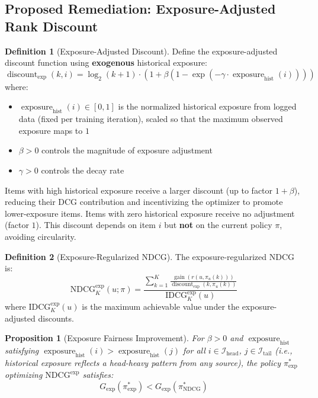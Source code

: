 \documentclass[11pt,a4paper]{article}
\theoremstyle{definition}
\newtheorem{definition}{Definition}[section]
\theoremstyle{plain}
\newtheorem{proposition}[theorem]{Proposition}
\theoremstyle{remark}
\newcommand{\NDCG}{\mathrm{NDCG}}
\newcommand{\IDCG}{\mathrm{IDCG}}
\DeclareMathOperator{\gain}{gain}
\DeclareMathOperator{\discount}{discount}
\DeclareMathOperator{\exposure}{exposure}
\begin{document}
\subsection{Proposed Remediation: Exposure-Adjusted Rank Discount}
\label{subsec:h1_remediation}

\begin{definition}[Exposure-Adjusted Discount]
\label{def:exp_discount}
Define the exposure-adjusted discount function using \textbf{exogenous} historical exposure:
\begin{equation}
    \discount_{\text{exp}}(k, i) = \log_2(k + 1) \cdot \left(1 + \beta \left(1 - \exp\left(-\gamma \cdot \exposure_{\text{hist}}(i)\right)\right)\right)
\end{equation}
where:
\begin{itemize}
    \item $\exposure_{\text{hist}}(i) \in [0, 1]$ is the normalized historical exposure from logged data (fixed per training iteration), scaled so that the maximum observed exposure maps to $1$
    \item $\beta > 0$ controls the magnitude of exposure adjustment
    \item $\gamma > 0$ controls the decay rate
\end{itemize}
Items with high historical exposure receive a larger discount (up to factor $1 + \beta$), reducing their DCG contribution and incentivizing the optimizer to promote lower-exposure items. Items with zero historical exposure receive no adjustment (factor $1$). This discount depends on item $i$ but \textbf{not} on the current policy $\pi$, avoiding circularity.
\end{definition}

\begin{definition}[Exposure-Regularized NDCG]
\label{def:exp_ndcg}
The exposure-regularized NDCG is:
\begin{equation}
    \NDCG^{\text{exp}}_K(u; \pi) = \frac{\sum_{k=1}^{K} \frac{\gain(r(u, \pi_u(k)))}{\discount_{\text{exp}}(k, \pi_u(k))}}{\IDCG^{\text{exp}}_K(u)}
\end{equation}
where $\IDCG^{\text{exp}}_K(u)$ is the maximum achievable value under the exposure-adjusted discounts.
\end{definition}

\begin{proposition}[Exposure Fairness Improvement]
\label{prop:exp_fair}
For $\beta > 0$ and $\exposure_{\text{hist}}$ satisfying $\exposure_{\text{hist}}(i) > \exposure_{\text{hist}}(j)$ for all $i \in \mathcal{I}_{\text{head}}$, $j \in \mathcal{I}_{\text{tail}}$ (i.e., historical exposure reflects a head-heavy pattern from any source), the policy $\pi^*_{\text{exp}}$ optimizing $\NDCG^{\text{exp}}$ satisfies:
\begin{equation}
    G_{\text{exp}}(\pi^*_{\text{exp}}) < G_{\text{exp}}(\pi^*_{\NDCG})
\end{equation}
\end{proposition}
\end{document}
